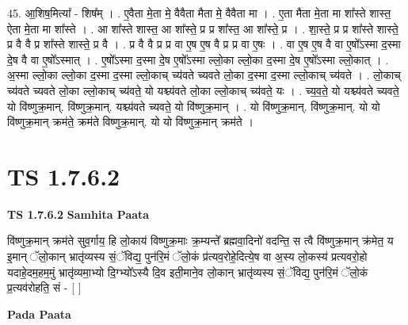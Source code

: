 \documentclass[17pt]{extarticle}
\begin{document}
45. आ॒शिष॒मित्या᳚ - शिष᳚म् । . ए॒वैता मे॒ता मे॒ वैवैता मैता मे॒ वैवैता मा । . ए॒ता मैता मे॒ता मा शा᳚स्ते शास्त॒ ऐता मे॒ता मा शा᳚स्ते । . आ शा᳚स्ते शास्त॒ आ शा᳚स्ते॒ प्र प्र शा᳚स्त॒ आ शा᳚स्ते॒ प्र । . शा॒स्ते॒ प्र प्र शा᳚स्ते शास्ते॒ प्र वै वै प्र शा᳚स्ते शास्ते॒ प्र वै । . प्र वै वै प्र प्र वा ए॒ष ए॒ष वै प्र प्र वा ए॒षः । . वा ए॒ष ए॒ष वै वा ए॒षो᳚ऽस्मा द॒स्मा दे॒ष वै वा ए॒षो᳚ऽस्मात् । . ए॒षो᳚ऽस्मा द॒स्मा दे॒ष ए॒षो᳚ऽस्मा ल्लो॒का ल्लो॒का द॒स्मा दे॒ष ए॒षो᳚ऽस्मा ल्लो॒कात् । . अ॒स्मा ल्लो॒का ल्लो॒का द॒स्मा द॒स्मा ल्लो॒काच् च्य॑वते च्यवते लो॒का द॒स्मा द॒स्मा ल्लो॒काच् च्य॑वते । . लो॒काच् च्य॑वते च्यवते लो॒का ल्लो॒काच् च्य॑वते॒ यो यश्च्य॑वते लो॒का ल्लो॒काच् च्य॑वते॒ यः । . च्य॒व॒ते॒ यो यश्च्य॑वते च्यवते॒ यो वि॑ष्णुक्र॒मान्. वि॑ष्णुक्र॒मान्. यश्च्य॑वते च्यवते॒ यो वि॑ष्णुक्र॒मान् । . यो वि॑ष्णुक्र॒मान्. वि॑ष्णुक्र॒मान्. यो यो वि॑ष्णुक्र॒मान् क्रम॑ते॒ क्रम॑ते विष्णुक्र॒मान्. यो यो वि॑ष्णुक्र॒मान् क्रम॑ते । \newline
\pagebreak
{}

\section{ TS 1.7.6.2 }

\textbf{TS 1.7.6.2 } \newline
\textbf{Samhita Paata} \newline

वि॑ष्णुक्र॒मान् क्रम॑ते सुव॒र्गाय॒ हि लो॒काय॑ विष्णुक्र॒माः क्र॒म्यन्ते᳚ ब्रह्मवा॒दिनो॑ वदन्ति॒ स त्वै वि॑ष्णुक्र॒मान् क्र॑मेत॒ य इ॒मान् ॅलो॒कान् भ्रातृ॑व्यस्य सं॒ॅविद्य॒ पुन॑रि॒मं ॅलो॒कं प्र॑त्यव॒रोहे॒दित्ये॒ष वा अ॒स्य लो॒कस्य॑ प्रत्यवरो॒हो यदाहे॒दम॒हम॒मुं भ्रातृ॑व्यमा॒भ्यो दि॒ग्भ्यो᳚ऽस्यै दि॒व इती॒माने॒व लो॒कान् भ्रातृ॑व्यस्य सं॒ॅविद्य॒ पुन॑रि॒मं ॅलो॒कं प्र॒त्यव॑रोहति॒ सं - [ ] \newline

\textbf{Pada Paata} \newline
\end{document}

